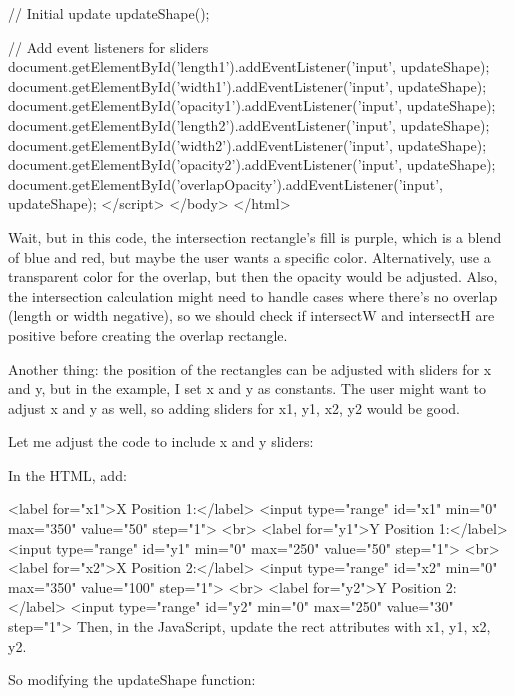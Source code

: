     // Initial update
    updateShape();
    
    // Add event listeners for sliders
    document.getElementById('length1').addEventListener('input', updateShape);
    document.getElementById('width1').addEventListener('input', updateShape);
    document.getElementById('opacity1').addEventListener('input', updateShape);
    document.getElementById('length2').addEventListener('input', updateShape);
    document.getElementById('width2').addEventListener('input', updateShape);
    document.getElementById('opacity2').addEventListener('input', updateShape);
    document.getElementById('overlapOpacity').addEventListener('input', updateShape);
  </script>
</body>
</html>

Wait, but in this code, the intersection rectangle's fill is purple, which is a blend of blue and red, but maybe the user wants a specific color. Alternatively, use a transparent color for the overlap, but then the opacity would be adjusted. Also, the intersection calculation might need to handle cases where there's no overlap (length or width negative), so we should check if intersectW and intersectH are positive before creating the overlap rectangle.

Another thing: the position of the rectangles can be adjusted with sliders for x and y, but in the example, I set x and y as constants. The user might want to adjust x and y as well, so adding sliders for x1, y1, x2, y2 would be good.

Let me adjust the code to include x and y sliders:

In the HTML, add:

<label for="x1">X Position 1:</label>
<input type="range" id="x1" min="0" max="350" value="50" step="1">
<br>
<label for="y1">Y Position 1:</label>
<input type="range" id="y1" min="0" max="250" value="50" step="1">
<br>
<label for="x2">X Position 2:</label>
<input type="range" id="x2" min="0" max="350" value="100" step="1">
<br>
<label for="y2">Y Position 2:</label>
<input type="range" id="y2" min="0" max="250" value="30" step="1">
Then, in the JavaScript, update the rect attributes with x1, y1, x2, y2.

So modifying the updateShape function:

